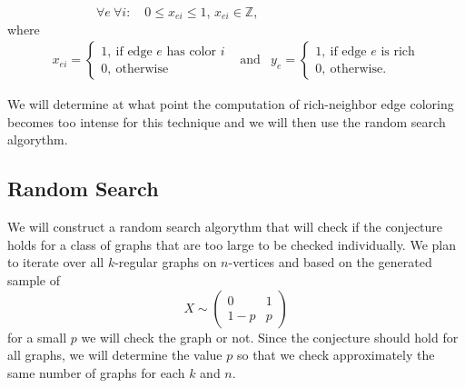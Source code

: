 \documentclass[12pt,a4paper]{amsart}
\theoremstyle{definition} %
\theoremstyle{plain} %
\newcommand{\Z}{\mathbb Z}
\begin{document}
\ \ \ \ \ \ \ \ \ \ \ \ \ \ $\forall e \ \forall i: \quad 0 \leq x_{ei} \leq 1$, $x_{ei} \in \Z$,\\

where
\begin{align*}        x_{ei} = \begin{cases}
            1, \  \text{if edge $e$ has color $i$} \\
            0, \  \text{otherwise}
    \end{cases} & \text{and} & 
    y_{e} = \begin{cases}
        1, \  \text{if edge $e$ is rich} \\
        0, \  \text{otherwise.}
    \end{cases}
\end{align*}

 We will determine at what point the computation of rich-neighbor edge coloring becomes 
 too intense for this technique and we will then use the random search algorythm.

\subsection{Random Search}

We will construct a random search algorythm that will check if the conjecture holds for
a class of graphs that are too large to be checked individually. We plan to iterate over 
all $k$-regular graphs on $n$-vertices and based on the generated sample of 
$$
X \sim \begin{pmatrix}
    0 & 1 \\
    1 - p & p
\end{pmatrix}
$$
for a small $p$ we will check the graph or not. Since the conjecture should hold for all
graphs, we will determine the value $p$ so that we check approximately the same number of graphs for
each $k$ and $n$.
\end{document}

